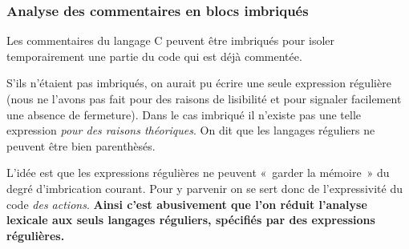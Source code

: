 %
\begin{frame}
\frametitle{Analyse des commentaires en blocs imbriqués}

Les commentaires du langage C peuvent être imbriqués pour isoler
temporairement une partie du code qui est déjà commentée.

\bigskip

S'ils n'étaient pas imbriqués, on aurait pu écrire une seule
expression régulière (nous ne l'avons pas fait pour des raisons de
lisibilité et pour signaler facilement une absence de fermeture). Dans
le cas imbriqué il n'existe pas une telle expression \emph{pour des
raisons théoriques}. On dit que les langages réguliers ne peuvent être
bien parenthèsés.

\bigskip

L'idée est que les expressions régulières ne peuvent «~garder la
mémoire~» du degré d'imbrication courant. Pour y parvenir on se sert
donc de l'expressivité du code \emph{des actions}. \textbf{Ainsi c'est
abusivement que l'on réduit l'analyse lexicale aux seuls langages
réguliers, spécifiés par des expressions régulières.}

\end{frame}

